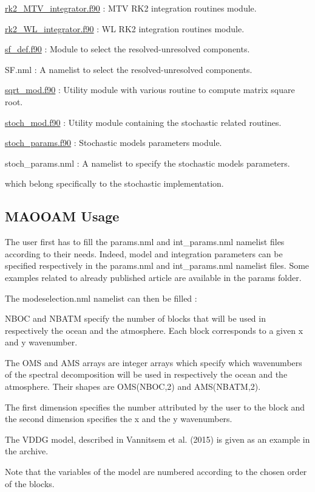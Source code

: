 \begin{DoxyItemize}
\item \hyperlink{rk2__MTV__integrator_8f90}{rk2\+\_\+\+M\+T\+V\+\_\+integrator.\+f90} \+: M\+TV R\+K2 integration routines module.
\item \hyperlink{rk2__WL__integrator_8f90}{rk2\+\_\+\+W\+L\+\_\+integrator.\+f90} \+: WL R\+K2 integration routines module.
\item \hyperlink{sf__def_8f90}{sf\+\_\+def.\+f90} \+: Module to select the resolved-\/unresolved components.
\item S\+F.\+nml \+: A namelist to select the resolved-\/unresolved components.
\item \hyperlink{sqrt__mod_8f90}{sqrt\+\_\+mod.\+f90} \+: Utility module with various routine to compute matrix square root.
\item \hyperlink{stoch__mod_8f90}{stoch\+\_\+mod.\+f90} \+: Utility module containing the stochastic related routines.
\item \hyperlink{stoch__params_8f90}{stoch\+\_\+params.\+f90} \+: Stochastic models parameters module.
\item stoch\+\_\+params.\+nml \+: A namelist to specify the stochastic models parameters.
\end{DoxyItemize}

which belong specifically to the stochastic implementation.





\subsection*{M\+A\+O\+O\+AM Usage}

The user first has to fill the params.\+nml and int\+\_\+params.\+nml namelist files according to their needs. Indeed, model and integration parameters can be specified respectively in the params.\+nml and int\+\_\+params.\+nml namelist files. Some examples related to already published article are available in the params folder.

The modeselection.\+nml namelist can then be filled \+:
\begin{DoxyItemize}
\item N\+B\+OC and N\+B\+A\+TM specify the number of blocks that will be used in respectively the ocean and the atmosphere. Each block corresponds to a given x and y wavenumber.
\item The O\+MS and A\+MS arrays are integer arrays which specify which wavenumbers of the spectral decomposition will be used in respectively the ocean and the atmosphere. Their shapes are O\+M\+S(\+N\+B\+O\+C,2) and A\+M\+S(\+N\+B\+A\+T\+M,2).
\item The first dimension specifies the number attributed by the user to the block and the second dimension specifies the x and the y wavenumbers.
\item The V\+D\+DG model, described in Vannitsem et al. (2015) is given as an example in the archive.
\item Note that the variables of the model are numbered according to the chosen order of the blocks.
\end{DoxyItemize}

